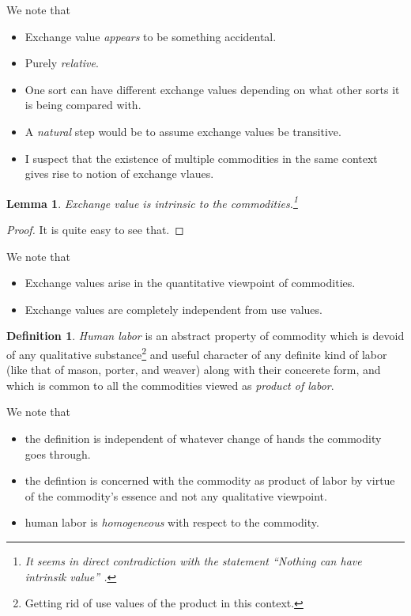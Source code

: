 \documentclass[12pt]{extarticle}
\newtheorem{lemma}[theorem]{Lemma}
\theoremstyle{definition}
\newtheorem{definition}{Definition}[section]
\newenvironment{remark}[1][Remark]{\begin{trivlist}
\item[\hskip \labelsep {\bfseries #1}]}{\end{trivlist}}
\begin{document}
  \begin{remark}
    We note that
    \begin{itemize}
    \item Exchange value \emph{appears} to be something accidental.
    \item Purely \emph{relative}.
    \item One sort can have different exchange values depending on what other sorts it is being compared with.
    \item A \emph{natural} step would be to assume exchange values be transitive.
      \item I suspect that the existence of multiple commodities in the same context gives rise to notion of exchange vlaues.
    \end{itemize}
    \end{remark}

    \begin{lemma}
      \label{lemma:exval}
      Exchange value is intrinsic to the commodities.\footnote{It seems in direct contradiction with the statement ``Nothing can have intrinsik value'' \cite{Barbon:777}.}
    \end{lemma}

    \begin{proof}
      It is quite easy to see that.
      \end{proof}

      \begin{remark}
        We note that
        \begin{itemize}
        \item Exchange values arise in the quantitative viewpoint of commodities.
          \item Exchange values are completely independent from use values.
          \end{itemize}
        \end{remark}

        \begin{definition}
          \emph{Human labor} is an abstract property of commodity which is devoid of any qualitative substance\footnote{Getting rid of use values of the product in this context.} and useful character of any definite kind of labor (like that of mason, porter, and weaver) along with their concerete form, and which is common to all the commodities viewed as \emph{product of labor}.
        \end{definition}

        \begin{remark}
        We note that
        \begin{itemize}
        \item the definition is independent of whatever change of hands the commodity goes through.
        \item the defintion is concerned with the commodity as product of labor by virtue of the commodity's essence and not any qualitative viewpoint.
        \item human labor is \emph{homogeneous} with respect to the commodity.
        \end{itemize}
      \end{remark}
\end{document}
